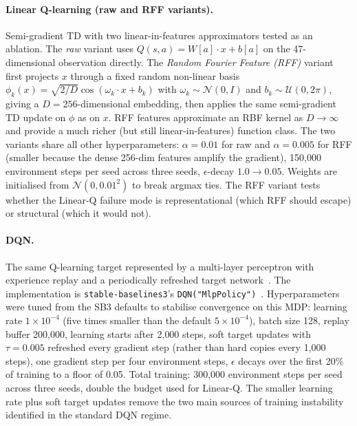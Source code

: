 \paragraph{Linear Q-learning (raw and RFF variants).} Semi-gradient TD with two linear-in-features approximators tested as an ablation. The \emph{raw} variant uses $Q(s,a) = W[a] \cdot x + b[a]$ on the 47-dimensional observation directly. The \emph{Random Fourier Feature (RFF)} variant first projects $x$ through a fixed random non-linear basis $\phi_k(x) = \sqrt{2/D} \cos(\omega_k \cdot x + b_k)$ with $\omega_k \sim \mathcal{N}(0, I)$ and $b_k \sim \mathcal{U}(0, 2\pi)$, giving a $D = 256$-dimensional embedding, then applies the same semi-gradient TD update on $\phi$ as on $x$. RFF features approximate an RBF kernel as $D \to \infty$ and provide a much richer (but still linear-in-features) function class. The two variants share all other hyperparameters: $\alpha = 0.01$ for raw and $\alpha = 0.005$ for RFF (smaller because the dense 256-dim features amplify the gradient), 150{,}000 environment steps per seed across three seeds, $\epsilon$-decay $1.0 \to 0.05$. Weights are initialised from $\mathcal{N}(0, 0.01^2)$ to break argmax ties. The RFF variant tests whether the Linear-Q failure mode is representational (which RFF should escape) or structural (which it would not).

\paragraph{DQN.} The same Q-learning target represented by a multi-layer perceptron with experience replay and a periodically refreshed target network~\citep{mnih2015dqn}. The implementation is \texttt{stable-baselines3}'s \texttt{DQN("MlpPolicy")}~\citep{raffin2021sb3}. Hyperparameters were tuned from the SB3 defaults to stabilise convergence on this MDP: learning rate $1 \times 10^{-4}$ (five times smaller than the default $5 \times 10^{-4}$), batch size 128, replay buffer 200{,}000, learning starts after 2{,}000 steps, soft target updates with $\tau = 0.005$ refreshed every gradient step (rather than hard copies every 1{,}000 steps), one gradient step per four environment steps, $\epsilon$ decays over the first 20\% of training to a floor of 0.05. Total training: 300{,}000 environment steps per seed across three seeds, double the budget used for Linear-Q. The smaller learning rate plus soft target updates remove the two main sources of training instability identified in the standard DQN regime.

